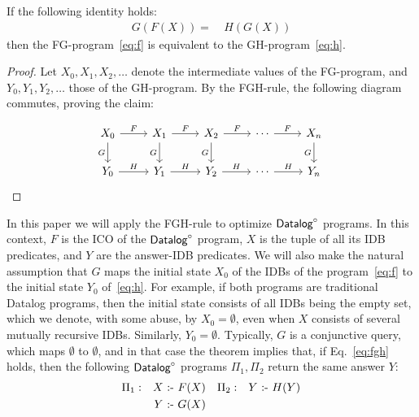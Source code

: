 \begin{thm}\label{th:fgh} If the following identity
  holds:
%
  \begin{align}
    G(F(X)) = & \ H(G(X)) \label{eq:fgh}
  \end{align}
%
  then the FG-program~\eqref{eq:f} is equivalent to the
  GH-program~\eqref{eq:h}.
%
\end{thm}
%
\begin{proof}
  Let $X_0, X_1, X_2, \ldots$ denote the intermediate values of the
  FG-program, and $Y_0, Y_1, Y_2, \ldots$ those of the GH-program.
  By the FGH-rule,  the following diagram commutes, proving
  the claim:

\[\begin{tikzcd}
	{X_0} & {X_1} & {X_2} & \cdots & {X_n} \\
	{Y_0} & {Y_1} & {Y_2} & \cdots & {Y_n}
	\arrow["F", from=1-1, to=1-2]
	\arrow["G"', from=1-1, to=2-1]
	\arrow["H", from=2-1, to=2-2]
	\arrow["G"', from=1-2, to=2-2]
	\arrow["F", from=1-2, to=1-3]
	\arrow["H", from=2-2, to=2-3]
	\arrow["G"', from=1-3, to=2-3]
	\arrow["F", from=1-3, to=1-4]
	\arrow["H", from=2-3, to=2-4]
	\arrow["G"', from=1-5, to=2-5]
	\arrow["F", from=1-4, to=1-5]
	\arrow["H", from=2-4, to=2-5]
\end{tikzcd}\]
\end{proof}

In this paper we will apply the FGH-rule to optimize $\text{\sf Datalog}^\circ$ programs.
In this context, $F$ is the ICO of the $\text{\sf Datalog}^\circ$ program, $X$ is the
tuple of all its IDB predicates, and $Y$ are the answer-IDB
predicates.  We will also make the natural assumption that $G$ maps
the initial state $X_0$ of the IDBs of the program~\eqref{eq:f} to the
initial state $Y_0$ of~\eqref{eq:h}.  For example, if both programs
are traditional Datalog programs, then the initial state consists of
all IDBs being the empty set, which we denote, with some abuse, by
$X_0 = \emptyset$, even when $X$ consists of several mutually
recursive IDBs.  Similarly, $Y_0=\emptyset$. Typically, $G$ is a
conjunctive query, which maps $\emptyset$ to $\emptyset$, and in that
case the theorem implies that, if Eq.~\eqref{eq:fgh} holds, then the
following $\text{\sf Datalog}^\circ$ programs $\Pi_1, \Pi_2$ return the same answer $Y$:
\begin{align}
\Pi_1: &&  X \text{ :- } & F(X) & \Pi_2: && Y \text{ :- } & H(Y) \nonumber \\
     &&  Y \text{ :- } & G(X) \label{eq:p1:p2}
\end{align}

